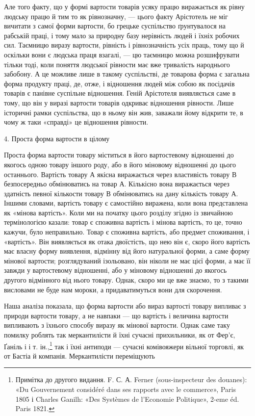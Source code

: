 Але того факту, що у формі вартости товарів усяку працю виражається
як рівну людську працю й тим то як рівнозначну, —
цього факту Арістотель не міг вичитати з самої форми вартости,
бо грецьке суспільство ґрунтувалося на рабській праці, і тому
мало за природну базу нерівність людей і їхніх робочих сил.
Таємницю виразу вартости, рівність і рівнозначність усіх праць,
тому що й оскільки вони є людська праця взагалі, — цю таємницю
можна розшифрувати тільки тоді, коли поняття людської рівности
має вже тривалість народнього забобону. А це можливе лише в
такому суспільстві, де товарова форма є загальна форма продукту
праці, де, отже, і відношення людей між собою як посідачів товарів
є панівне суспільне відношення. Геній Арістотеля виявляється
саме в тому, що він у виразі вартости товарів одкриває відношення
рівности. Лише історичні рамки суспільства, що в ньому він жив,
заважали йому відкрити те, в чому ж таки «справді» це відношення
рівности.

4. Проста форма вартости в цілому

Проста форма вартости товару міститься в його вартостевому
відношенні до якогось одною товару іншого роду, або в його міновому
відношенні до цього останнього. Вартість товару А якісна
виражається через властивість товару В безпосередньо обмінюватись
на товар А. Кількісно вона виражається через здатність
певної кількости товару В обмінюватись на дану кількість товару
А. Іншими словами, вартість товару є самостійно виражена, коли
вона представлена як «мінова вартість». Коли ми на початку цього
розділу згідно із звичайною термінологією казали: товар є споживна
вартість і мінова вартість, то це, точно кажучи, було неправильно.
Товар є споживна вартість, або предмет споживання, і
«вартість». Він виявляється як отака двоїстість, що нею він є,
скоро його вартість має власну форму виявлення, відмінну від
його натуральної форми, а саме форму мінової вартости; розглядуваний
ізольовано, він ніколи не має цієї форми, а має її завжди
у вартостевому відношенні, або у міновому відношенні до якогось
другого відмінного від нього товару. Однак, скоро ми це вже
знаємо, то з такими висловами не буде нам мороки, а придаватимуться
вони для скорочення.

Наша аналіза показала, що форма вартости або вираз вартості
товару випливає з природи вартости товару, а не навпаки — що
вартість і величина вартости випливають з їхнього способу виразу
як мінової вартости. Однак саме таку помилку роблять так меркантилісти
й їхні сучасні прихильники, як от Фер’є, Ґаніль і
і т. ін.,\footnote{
Примітка до другого видання. F. С. А. Ferner (sous-inspecteur
des douanes): «Du Gouvernement considéré dans ses rapports avec
le commerce», Paris 1805 і Charles Ganilh: «Des Systèmes de l’Economie
Politique», 2-eme éd. Paris 1821.
} так і їхні антиподи — сучасні комівояжери вільної торговлі,
як от Бастіа й компанія. Меркантилісти переміщують